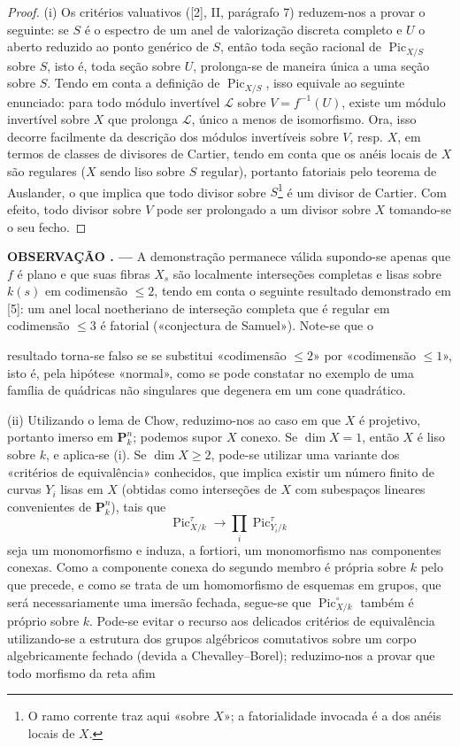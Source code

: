\documentclass[11pt,twoside,openany]{book}
\numberwithin{equation}{section}
\newcommand{\src}[1]{%
  \phantomsection\hypertarget{src:#1}{}%
  \marginpar{\raggedleft\footnotesize\sffamily #1}%
}
\theoremstyle{plain}
\theoremstyle{definition}
\theoremstyle{remark}
\newcommand{\result}[2]{%
  \par\medskip\noindent\textbf{#1%
  \if\relax\detokenize{#2}\relax\else\space#2\fi. ---}\enspace
}
\newcommand{\FgaUnitKey}{frontmatter}
\renewcommand{\src}[1]{%
  \phantomsection\hypertarget{src:\FgaUnitKey:#1}{}%
  \marginpar{\raggedleft\footnotesize\sffamily #1}%
}
\begin{document}
\begin{proof}
(i) Os critérios valuativos ([2], II, parágrafo 7) reduzem-nos a provar o
seguinte: se $S$ é o espectro de um anel de valorização discreta completo e $U$
o aberto reduzido ao ponto genérico de $S$, então toda seção racional de
$\operatorname{Pic}_{X/S}$ sobre $S$, isto é, toda seção sobre $U$, prolonga-se
de maneira única a uma seção sobre $S$. Tendo em conta a definição de
$\operatorname{Pic}_{X/S}$, isso equivale ao seguinte enunciado: para todo
módulo invertível $\mathcal L$ sobre $V=f^{-1}(U)$, existe um módulo invertível
sobre $X$ que prolonga $\mathcal L$, único a menos de isomorfismo. Ora, isso
decorre facilmente da descrição dos módulos invertíveis sobre $V$, resp. $X$,
em termos de classes de divisores de Cartier, tendo em conta que os anéis
locais de $X$ são regulares ($X$ sendo liso sobre $S$ regular), portanto
fatoriais pelo teorema de Auslander, o que implica que todo divisor sobre
$S$\footnote{O ramo corrente traz aqui «sobre $X$»; a fatorialidade invocada é
a dos anéis locais de $X$.} é um divisor de Cartier. Com efeito, todo divisor
sobre $V$ pode ser prolongado a um divisor sobre $X$ tomando-se o seu fecho.
\end{proof}

\result{OBSERVAÇÃO}{2.2} A demonstração permanece válida supondo-se apenas que
$f$ é plano e que suas fibras $X_s$ são localmente interseções completas e
lisas sobre $k(s)$ em codimensão $\leq2$, tendo em conta o seguinte resultado
demonstrado em [5]: um anel local noetheriano de interseção completa que é
regular em codimensão $\leq3$ é fatorial («conjectura de Samuel»). Note-se que o
\src{232}
resultado torna-se falso se se substitui «codimensão $\leq2$» por «codimensão
$\leq1$», isto é, pela hipótese «normal», como se pode constatar no exemplo de
uma família de quádricas não singulares que degenera em um cone quadrático.

(ii) Utilizando o lema de Chow, reduzimo-nos ao caso em que $X$ é projetivo,
portanto imerso em $\mathbf P_k^n$; podemos supor $X$ conexo. Se $\dim X=1$,
então $X$ é liso sobre $k$, e aplica-se (i). Se
$\dim X\geq2$, pode-se utilizar uma variante dos «critérios de equivalência»
conhecidos, que implica existir um número finito de curvas $Y_i$ lisas em $X$
(obtidas como interseções de $X$ com subespaços lineares convenientes de
$\mathbf P_k^n$), tais que
\[
\operatorname{Pic}_{X/k}^\tau\longrightarrow
\prod_i\operatorname{Pic}_{Y_i/k}^\tau
\]
seja um monomorfismo e induza, a fortiori, um monomorfismo nas componentes
conexas. Como a componente conexa do segundo membro é própria sobre $k$ pelo
que precede, e como se trata de um homomorfismo de esquemas em grupos, que será
necessariamente uma imersão fechada, segue-se que
$\operatorname{Pic}_{X/k}^\circ$ também é próprio sobre $k$. Pode-se evitar o
recurso aos delicados critérios de equivalência utilizando-se a estrutura dos
grupos algébricos comutativos sobre um corpo algebricamente fechado (devida a
Chevalley--Borel); reduzimo-nos a provar que todo morfismo da reta afim
\end{document}
